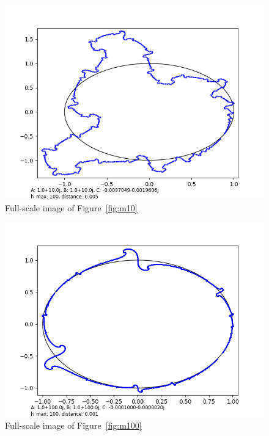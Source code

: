 \documentclass[12pt,a4paper,reqno,parskip=full]{amsart}
\numberwithin{equation}{section}
\theoremstyle{plain}
\theoremstyle{definition}
\begin{document}
\begin{figure}[H]
    \centering
    \includegraphics[width=\textwidth]{images/m/a10,b10,h100,d.005.png}
    \caption{Full-scale image of Figure~\ref{fig:m10}}
\end{figure}

\begin{figure}[H]
    \centering
    \includegraphics[width=\textwidth]{images/m/a100,b100,h100,d.0010.png}
    \caption{Full-scale image of Figure~\ref{fig:m100}}
\end{figure}
\end{document}
